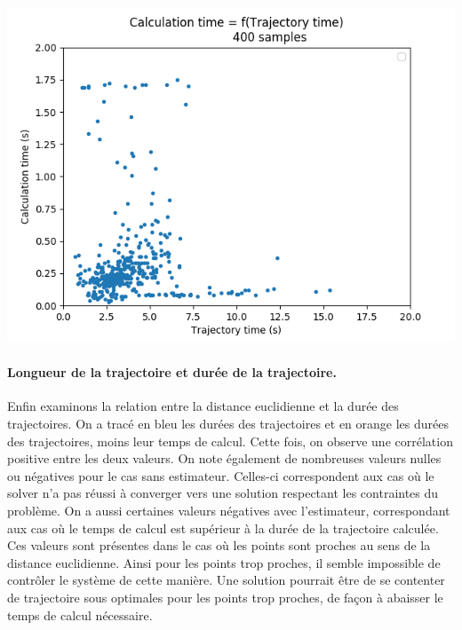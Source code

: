 \documentclass[a4paper,12pt]{report}
\begin{document}
\begin{minipage}[b]{0.45\textwidth}
	\begin{center}
		\includegraphics[width=1\linewidth]{images/calc_f(traj)_init.png}
		\label{fig:calc_f(euclid)_init}
	\end{center}
\end{minipage}
\vspace{0.5cm}


\paragraph{Longueur de la trajectoire et durée de la trajectoire.}
Enfin examinons la relation entre la distance euclidienne et la durée des trajectoires. On a tracé en bleu les durées des trajectoires et en orange les durées des trajectoires, moins leur temps de calcul. Cette fois, on observe une corrélation positive entre les deux valeurs. On note également de nombreuses valeurs nulles ou négatives pour le cas sans estimateur. Celles-ci correspondent aux cas où le solver n'a pas réussi à converger vers une solution respectant les contraintes du problème. On a aussi certaines valeurs négatives avec l'estimateur, correspondant aux cas où le temps de calcul est supérieur à la durée de la trajectoire calculée. Ces valeurs sont présentes dans le cas où les points sont proches au sens de la distance euclidienne. Ainsi pour les points trop proches, il semble impossible de contrôler le système de cette manière. Une solution pourrait être de se contenter de trajectoire sous optimales pour les points trop proches, de façon à abaisser le temps de calcul nécessaire.
\end{document}
